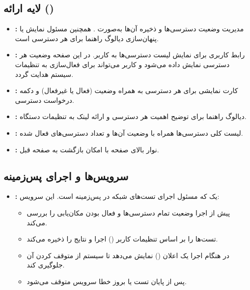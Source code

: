 \subsection{لایه ارائه ()}
\begin{itemize}
    \item \textbf{:}  
    مدیریت وضعیت دسترسی‌ها و ذخیره آن‌ها به‌صورت . همچنین مسئول نمایش یا پنهان‌سازی دیالوگ راهنما برای هر دسترسی است.
    
    \item \textbf{:}  
    رابط کاربری برای نمایش لیست دسترسی‌ها به کاربر. در این صفحه وضعیت هر دسترسی نمایش داده می‌شود و کاربر می‌تواند برای فعال‌سازی به تنظیمات سیستم هدایت گردد.

    \item \textbf{:} کارت نمایشی برای هر دسترسی به همراه وضعیت (فعال یا غیرفعال) و دکمه درخواست دسترسی.
    
    \item \textbf{:} دیالوگ راهنما برای توضیح اهمیت هر دسترسی و ارائه لینک به تنظیمات دستگاه.
    
    \item \textbf{:} لیست کلی دسترسی‌ها همراه با وضعیت آن‌ها و تعداد دسترسی‌های فعال شده.
    
    \item \textbf{:} نوار بالای صفحه با امکان بازگشت به صفحه قبل.
\end{itemize}

\subsection{سرویس‌ها و اجرای پس‌زمینه}
\begin{itemize}
    \item \textbf{:}  
    یک  که مسئول اجرای تست‌های شبکه در پس‌زمینه است. این سرویس:
    \begin{itemize}
        \item پیش از اجرا وضعیت تمام دسترسی‌ها و فعال بودن مکان‌یابی را بررسی می‌کند.
        \item تست‌ها را بر اساس تنظیمات کاربر () اجرا و نتایج را ذخیره می‌کند.
        \item در هنگام اجرا یک اعلان () نمایش می‌دهد تا سیستم از متوقف کردن آن جلوگیری کند.
        \item پس از پایان تست یا بروز خطا سرویس متوقف می‌شود.
    \end{itemize}
\end{itemize}

